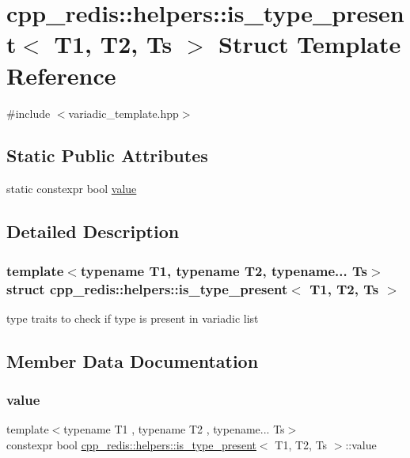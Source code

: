 \hypertarget{structcpp__redis_1_1helpers_1_1is__type__present}{}\section{cpp\+\_\+redis\+:\+:helpers\+:\+:is\+\_\+type\+\_\+present$<$ T1, T2, Ts $>$ Struct Template Reference}
\label{structcpp__redis_1_1helpers_1_1is__type__present}


{\ttfamily \#include $<$variadic\+\_\+template.\+hpp$>$}

\subsection*{Static Public Attributes}
\begin{DoxyCompactItemize}
\item 
static constexpr bool \hyperlink{structcpp__redis_1_1helpers_1_1is__type__present_a7b5e8d970ba974a9b58cbc440983c25c}{value}
\end{DoxyCompactItemize}


\subsection{Detailed Description}
\subsubsection*{template$<$typename T1, typename T2, typename... Ts$>$\newline
struct cpp\+\_\+redis\+::helpers\+::is\+\_\+type\+\_\+present$<$ T1, T2, Ts $>$}

type traits to check if type is present in variadic list 

\subsection{Member Data Documentation}
\mbox{\label{structcpp__redis_1_1helpers_1_1is__type__present_a7b5e8d970ba974a9b58cbc440983c25c}} 
\subsubsection{\texorpdfstring{value}{value}}
{\footnotesize\ttfamily template$<$typename T1 , typename T2 , typename... Ts$>$ \\
constexpr bool \hyperlink{structcpp__redis_1_1helpers_1_1is__type__present}{cpp\+\_\+redis\+::helpers\+::is\+\_\+type\+\_\+present}$<$ T1, T2, Ts $>$\+::value\hspace{0.3cm}{\ttfamily [static]}}


